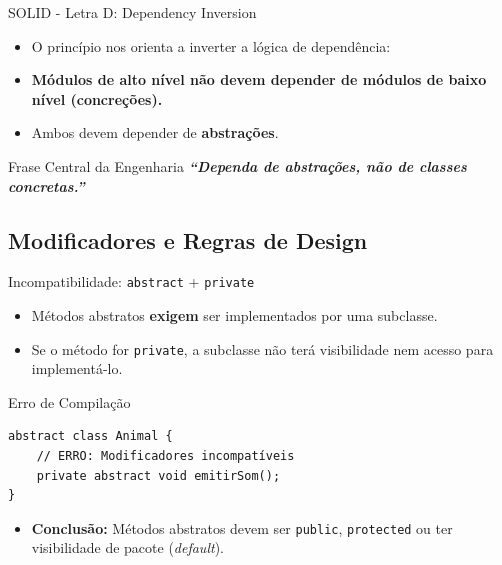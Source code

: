 \documentclass[9pt]{beamer}
\begin{document}
\begin{frame}{SOLID - Letra D: Dependency Inversion}
\begin{itemize}
    \item O princípio nos orienta a inverter a lógica de dependência:
    \item \textbf{Módulos de alto nível não devem depender de módulos de baixo nível (concreções).}
    \item Ambos devem depender de \textbf{abstrações}.
\end{itemize}

\vspace{0.4cm}

\begin{center}
    \begin{minipage}{0.85\textwidth}
        \begin{exampleblock}{Frase Central da Engenharia}
            \centering
            \Large \bfseries \itshape
            ``Dependa de abstrações, não de classes concretas.''
        \end{exampleblock}
    \end{minipage}
\end{center}
\end{frame}
\subsection{Modificadores e Regras de Design}
\begin{frame}[fragile]{Incompatibilidade: \texttt{abstract} + \texttt{private}}
\begin{itemize}
    \item Métodos abstratos \textbf{exigem} ser implementados por uma subclasse.
    \item Se o método for \texttt{private}, a subclasse não terá visibilidade nem acesso para implementá-lo.
\end{itemize}

\begin{alertblock}{Erro de Compilação}
\begin{verbatim}
abstract class Animal {
    // ERRO: Modificadores incompatíveis
    private abstract void emitirSom(); 
}
\end{verbatim}
\end{alertblock}

\begin{itemize}
    \item \textbf{Conclusão:} Métodos abstratos devem ser \texttt{public}, \texttt{protected} ou ter visibilidade de pacote (\textit{default}).
\end{itemize}
\end{frame}
\end{document}
